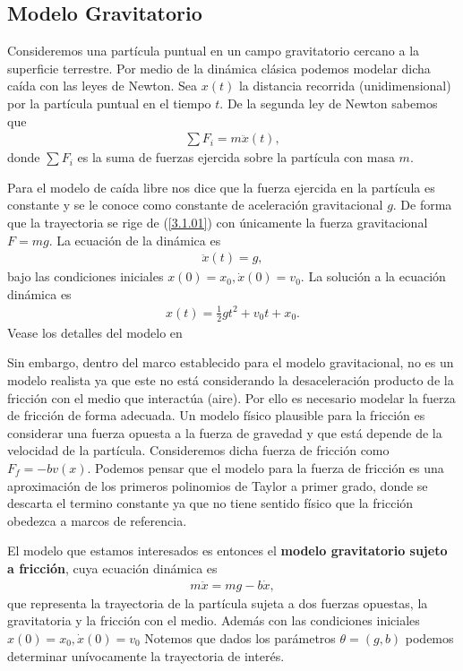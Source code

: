 \subsection{Modelo Gravitatorio}

Consideremos una partícula puntual en un campo gravitatorio cercano a la superficie terrestre. Por medio de la dinámica clásica podemos modelar dicha caída con las leyes de Newton. Sea $x(t)$ la distancia recorrida (unidimensional) por la partícula puntual en el tiempo $t$. De la segunda ley de Newton sabemos que
\begin{align}
    \sum F_i = m\ddot{x}(t),
    \label{3.1.01}
\end{align}
donde $\sum F_i$ es la suma de fuerzas ejercida sobre la partícula con masa $m$. 

Para el modelo de caída libre nos dice que la fuerza ejercida en la partícula es constante y se le conoce como constante de aceleración gravitacional $g$. De forma que la trayectoria se rige de (\ref{3.1.01}) con únicamente la fuerza gravitacional $F = mg$. La ecuación de la dinámica es 
\begin{align*}
    \ddot{x}(t) = g,
\end{align*}
bajo las condiciones iniciales $x(0) = x_0, \dot{x}(0) = v_0$. La solución a la ecuación dinámica es 
\begin{align*}
    x(t) = \frac{1}{2}gt^2 + v_0 t + x_0.
\end{align*}
Vease los detalles del modelo en \cite{alonso1970fisica}

Sin embargo, dentro del marco establecido para el modelo gravitacional, no es un modelo realista ya que este no está considerando la desaceleración producto de la fricción con el medio que interactúa (aire). Por ello es necesario modelar la fuerza de fricción de forma adecuada. Un modelo físico plausible para la fricción es considerar una fuerza opuesta a la fuerza de gravedad y que está depende de la velocidad de la partícula. Consideremos dicha fuerza de fricción como $F_f = -bv(x) $. Podemos pensar que el modelo para la fuerza de fricción es una aproximación de los primeros polinomios de Taylor a primer grado, donde se descarta el termino constante ya que no tiene sentido físico que la fricción obedezca a marcos de referencia. 

El modelo que estamos interesados es entonces el \textbf{modelo gravitatorio sujeto a fricción}, cuya ecuación dinámica es 
\begin{align}
    m \ddot{x} = mg - b\dot{x},
    \label{3.1.03}
\end{align}
que representa la trayectoria de la partícula sujeta a dos fuerzas opuestas, la gravitatoria y la fricción con el medio. Además con las condiciones iniciales $x(0) = x_0, \dot{x}(0) = v_0$ Notemos que dados los parámetros $\theta = (g,b)$ podemos determinar unívocamente la trayectoria de interés. 

